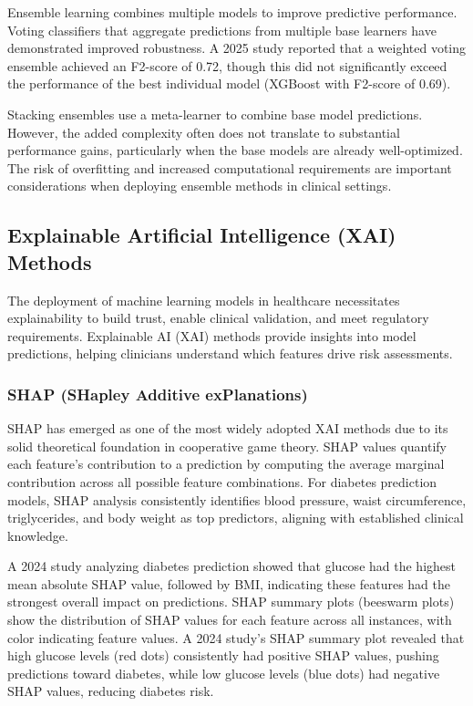 Ensemble learning combines multiple models to improve predictive performance. Voting classifiers that aggregate predictions from multiple base learners have demonstrated improved robustness. A 2025 study reported that a weighted voting ensemble achieved an F2-score of 0.72, though this did not significantly exceed the performance of the best individual model (XGBoost with F2-score of 0.69).

Stacking ensembles use a meta-learner to combine base model predictions. However, the added complexity often does not translate to substantial performance gains, particularly when the base models are already well-optimized. The risk of overfitting and increased computational requirements are important considerations when deploying ensemble methods in clinical settings.

\subsection{Explainable Artificial Intelligence (XAI) Methods}

The deployment of machine learning models in healthcare necessitates explainability to build trust, enable clinical validation, and meet regulatory requirements. Explainable AI (XAI) methods provide insights into model predictions, helping clinicians understand which features drive risk assessments.

\subsubsection{SHAP (SHapley Additive exPlanations)}

SHAP has emerged as one of the most widely adopted XAI methods due to its solid theoretical foundation in cooperative game theory. SHAP values quantify each feature's contribution to a prediction by computing the average marginal contribution across all possible feature combinations. For diabetes prediction models, SHAP analysis consistently identifies blood pressure, waist circumference, triglycerides, and body weight as top predictors, aligning with established clinical knowledge.

A 2024 study analyzing diabetes prediction showed that glucose had the highest mean absolute SHAP value, followed by BMI, indicating these features had the strongest overall impact on predictions. SHAP summary plots (beeswarm plots) show the distribution of SHAP values for each feature across all instances, with color indicating feature values. A 2024 study's SHAP summary plot revealed that high glucose levels (red dots) consistently had positive SHAP values, pushing predictions toward diabetes, while low glucose levels (blue dots) had negative SHAP values, reducing diabetes risk.


